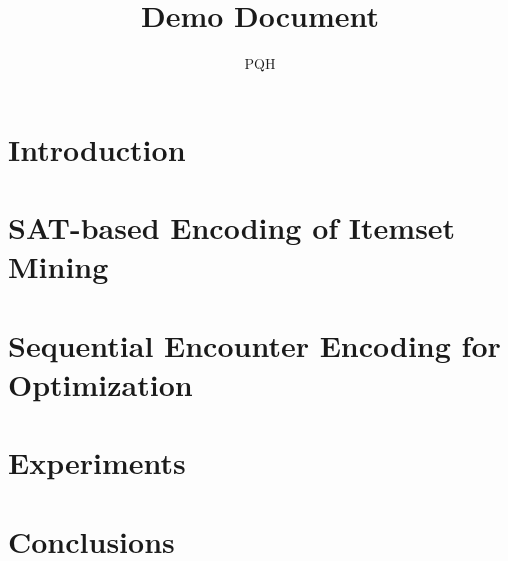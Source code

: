 \documentclass[14pt,a4paper]{report}
\title{Demo Document}
\author{PQH}
\begin{document}









\fontsize{13}{15}\selectfont

\chapter{Introduction}




\chapter{SAT-based Encoding of Itemset Mining}




\chapter{Sequential Encounter Encoding for Optimization}



\chapter{Experiments}



\chapter*{Conclusions}



% 

\end{document}
